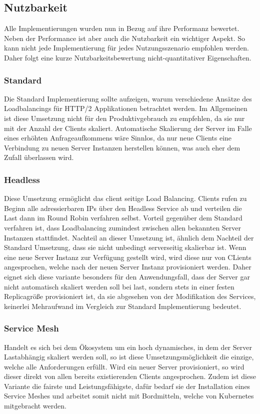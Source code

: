 \subsection{Nutzbarkeit}\label{subsec:nutzbarkeit}

Alle Implementierungen wurden nun in Bezug auf ihre Performanz bewertet.
Neben der Performance ist aber auch die Nutzbarkeit ein wichtiger Aspekt.
So kann nicht jede Implementierung für jedes Nutzungsszenario empfohlen werden.
Daher folgt eine kurze Nutzbarkeitsbewertung nicht-quantitativer Eigenschaften.

\subsubsection{Standard}
Die Standard Implementierung sollte aufzeigen, warum verschiedene Ansätze des Loadbalancings für HTTP/2 Applikationen betrachtet werden.
Im Allgemeinen ist diese Umsetzung nicht für den Produktivgebrauch zu empfehlen, da sie nur mit der Anzahl der Clients skaliert.
Automatische Skalierung der Server im Falle eines erhöhten Anfrageaufkommens wäre Sinnlos, da nur neue Clients eine Verbindung zu neuen Server Instanzen herstellen können, was auch eher dem Zufall überlassen wird.

\subsubsection{Headless}
Diese Umsetzung ermöglicht das client seitige Load Balancing.
Clients rufen zu Beginn alle adressierbaren IPs über den Headless Service ab und verteilen die Last dann im Round Robin verfahren selbst.
Vorteil gegenüber dem Standard verfahren ist, dass Loadbalancing zumindest zwischen allen bekannten Server Instanzen stattfindet.
Nachteil an dieser Umsetzung ist, ähnlich dem Nachteil der Standard Umsetzung, dass sie nicht unbedingt serverseitig skalierbar ist.
Wenn eine neue Server Instanz zur Verfügung gestellt wird, wird diese nur von CLients angesprochen, welche nach der neuen Server Instanz provisioniert werden.
Daher eignet sich diese variante besonders für den Anwendungsfall, dass der Server gar nicht automatisch skaliert werden soll bei last, sondern stets in einer festen Replicagröße provisioniert ist, da sie abgesehen von der Modifikation des Services, keinerlei Mehraufwand im Vergleich zur Standard Implementierung bedeutet.

\subsubsection{Service Mesh}
Handelt es sich bei dem Ökosystem um ein hoch dynamisches, in dem der Server Lastabhängig skaliert werden soll, so ist diese Umsetzungsmöglichkeit die einzige, welche alle Anforderungen erfüllt.
Wird ein neuer Server provisioniert, so wird dieser direkt von allen bereits existierenden Clients angesprochen.
Zudem ist diese Variante die fairste und Leistungsfähigste, dafür bedarf sie der Installation eines Service Meshes und arbeitet somit nicht mit Bordmitteln, welche von Kubernetes mitgebracht werden.
